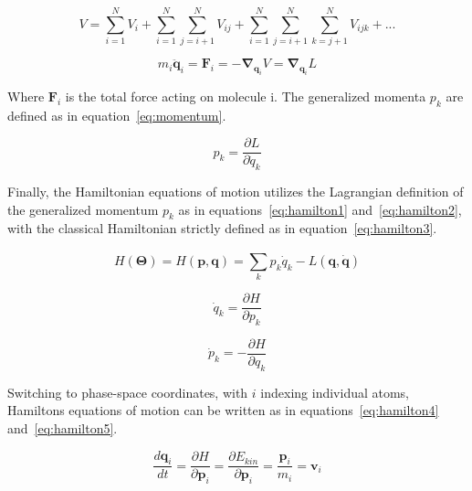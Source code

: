 \documentclass[11pt]{article}
\begin{document}
\begin{equation}
  V = \sum_{i=1}^{N}V_i + \sum_{i = 1}^{N}\sum_{j = i+1}^{N}V_{ij} + \sum_{i = 1}^{N}\sum_{j = i+1}^{N}\sum_{k = j+1}^{N}V_{ijk} + ...
  \label{eq:potential}
\end{equation}

\begin{equation}
  m_i \ddot{\textbf{q}}_i = \textbf{F}_i = -\mathbf{\nabla}_{\textbf{q}_i} V = \mathbf{\nabla}_{\textbf{q}_i} L
  \label{eq:lagrange3}
\end{equation}
\bigskip

\noindent Where $\textbf{F}_i$ is the total force acting on molecule i. The generalized momenta $p_k$ are defined as in equation~\ref{eq:momentum}.

\begin{equation}
  p_k = \frac{\partial L}{\partial \dot{q}_k}
  \label{eq:momentum}
\end{equation}

\bigskip


\noindent Finally, the Hamiltonian equations of motion utilizes the Lagrangian definition of the generalized momentum $p_k$ as in equations~\ref{eq:hamilton1} and~\ref{eq:hamilton2}, with the classical Hamiltonian strictly defined as in equation~\ref{eq:hamilton3}.

\begin{equation}
  H(\mathbf{\Theta}) = H(\textbf{p}, \textbf{q}) = \sum_{k}^{}p_k\dot{q}_k - L(\textbf{q}, \dot{\textbf{q}})
  \label{eq:hamilton3}
\end{equation}

\begin{equation}
  \dot{q}_k = \frac{\partial H}{\partial p_k}
  \label{eq:hamilton1}
\end{equation}

\begin{equation}
  \dot{p}_k = -\frac{\partial H}{\partial q_k}
  \label{eq:hamilton2}
\end{equation}



\bigskip

\noindent Switching to phase-space coordinates, with $i$ indexing individual atoms, Hamiltons equations of motion can be written as in equations~\ref{eq:hamilton4} and~\ref{eq:hamilton5}.

\begin{equation}
  \frac{d\textbf{q}_i}{dt} =\frac{\partial H}{\partial \textbf{p}_i} = \frac{\partial E_{kin}}{\partial \textbf{p}_i} =\frac{\textbf{p}_i}{m_i} = \textbf{v}_i
  \label{eq:hamilton4}
\end{equation}
\end{document}
